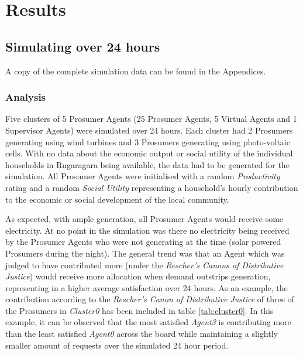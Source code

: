 \chapter{Results}
\label{Results}

\section*{Simulating over 24 hours}
A copy of the complete simulation data can be found in the Appendices.

\subsection*{Analysis}
Five clusters of 5 Prosumer Agents (25 Prosumer Agents, 5 Virtual Agents and 1 Supervisor Agents) were simulated over 24 hours. Each cluster had 2 Prosumers generating using wind turbines and 3 Prosumers generating using photo-voltaic cells. With no data about the economic output or social utility of the individual households in Rugaragara being available, the data had to be generated for the simulation. All Prosumer Agents were initialised with a random \textit{Productivity} rating and a random \textit{Social Utility} representing a household's hourly contribution to the economic or social development of the local community.

As expected, with ample generation, all Prosumer Agents would receive some electricity. At no point in the simulation was there no electricity being received by the Prosumer Agents who were not generating at the time (solar powered Prosumers during the night). The general trend was that an Agent which was judged to have contributed more (under the \textit{Rescher's Canons of Distributive Justice}) would receive more allocation when demand outstrips generation, representing in a higher average satisfaction over 24 hours. As an example, the contribution according to the \textit{Rescher's Canon of Distributive Justice} of three of the Prosumers in \textit{Cluster0} has been included in table \ref{tab:cluster0}. In this example, it can be observed that the most satisfied \textit{Agent3} is contributing more than the least satisfied \textit{Agent0} across the board while maintaining a slightly smaller amount of requests over the simulated 24 hour period. 

